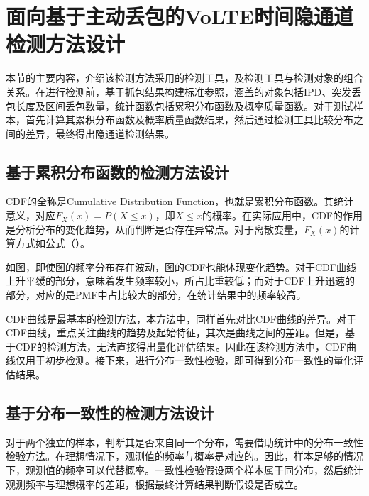 \section{面向基于主动丢包的VoLTE时间隐通道检测方法设计}
\label{chap:analyze:statistical}

本节的主要内容，介绍该检测方法采用的检测工具，及检测工具与检测对象的组合关系。在进行检测前，基于抓包结果构建标准参照，涵盖的对象包括IPD、突发丢包长度及区间丢包数量，统计函数包括累积分布函数及概率质量函数。对于测试样本，首先计算其累积分布函数及概率质量函数结果，然后通过检测工具比较分布之间的差异，最终得出隐通道检测结果。

\subsection{基于累积分布函数的检测方法设计}
\label{chap:analyze:statistical:cdf}

CDF的全称是Cumulative Distribution Function，也就是累积分布函数。其统计意义，对应$F_{X}(x)=P (X\leq x)$，即$X\leq x$的概率。在实际应用中，CDF的作用是分析分布的变化趋势，从而判断是否存在异常点。对于离散变量，$F_{X}(x)$的计算方式如公式（）。


如图，即使图的频率分布存在波动，图的CDF也能体现变化趋势。对于CDF曲线上升平缓的部分，意味着发生频率较小，所占比重较低；而对于CDF上升迅速的部分，对应的是PMF中占比较大的部分，在统计结果中的频率较高。

CDF曲线是最基本的检测方法，本方法中，同样首先对比CDF曲线的差异。对于CDF曲线，重点关注曲线的趋势及起始特征，其次是曲线之间的差距。但是，基于CDF的检测方法，无法直接得出量化评估结果。因此在该检测方法中，CDF曲线仅用于初步检测。接下来，进行分布一致性检验，即可得到分布一致性的量化评估结果。

\subsection{基于分布一致性的检测方法设计}
\label{chap:analyze:statistical:test}

对于两个独立的样本，判断其是否来自同一个分布，需要借助统计中的分布一致性检验方法。在理想情况下，观测值的频率与概率是对应的。因此，样本足够的情况下，观测值的频率可以代替概率。一致性检验假设两个样本属于同分布，然后统计观测频率与理想概率的差距，根据最终计算结果判断假设是否成立。


